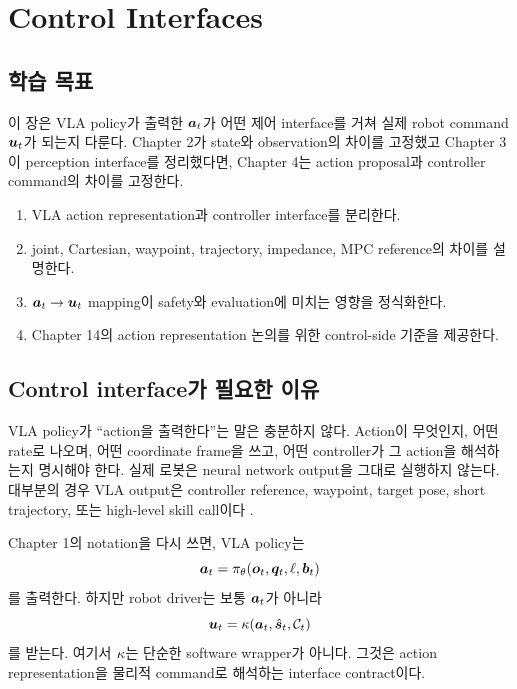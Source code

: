 \chapter{Control Interfaces}

\section*{학습 목표}
이 장은 VLA policy가 출력한 $\bm{a}_t$가 어떤 제어 interface를 거쳐 실제 robot command $\bm{u}_t$가 되는지 다룬다. Chapter 2가 state와 observation의 차이를 고정했고 Chapter 3이 perception interface를 정리했다면, Chapter 4는 action proposal과 controller command의 차이를 고정한다.

\begin{enumerate}
  \item VLA action representation과 controller interface를 분리한다.
  \item joint, Cartesian, waypoint, trajectory, impedance, MPC reference의 차이를 설명한다.
  \item $\bm{a}_t \rightarrow \bm{u}_t$ mapping이 safety와 evaluation에 미치는 영향을 정식화한다.
  \item Chapter 14의 action representation 논의를 위한 control-side 기준을 제공한다.
\end{enumerate}

\section{Control interface가 필요한 이유}

VLA policy가 ``action을 출력한다''는 말은 충분하지 않다. Action이 무엇인지, 어떤 rate로 나오며, 어떤 coordinate frame을 쓰고, 어떤 controller가 그 action을 해석하는지 명시해야 한다. 실제 로봇은 neural network output을 그대로 실행하지 않는다. 대부분의 경우 VLA output은 controller reference, waypoint, target pose, short trajectory, 또는 high-level skill call이다 \cite{khatib1987,hogan1985,mayne2000}.

Chapter 1의 notation을 다시 쓰면, VLA policy는
\begin{equation}
  \bm{a}_t = \pi_\theta(\bm{o}_t, \bm{q}_t, \ell, \bm{b}_t)
  \label{eq:ch3-policy}
\end{equation}
를 출력한다. 하지만 robot driver는 보통 $\bm{a}_t$가 아니라
\begin{equation}
  \bm{u}_t = \kappa(\bm{a}_t,\hat{\bm{s}}_t,\mathcal{C}_t)
  \label{eq:ch3-controller-map}
\end{equation}
를 받는다. 여기서 $\kappa$는 단순한 software wrapper가 아니다. 그것은 action representation을 물리적 command로 해석하는 interface contract이다.


